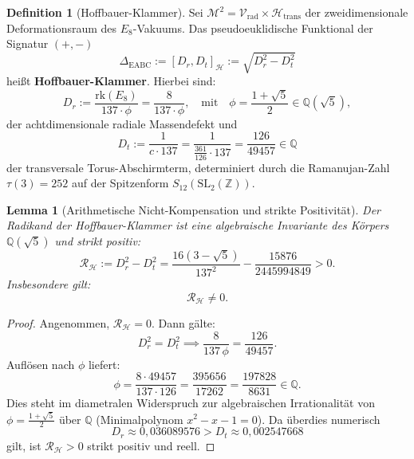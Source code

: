 \documentclass[11pt,a4paper]{article}
\newtheorem{lemma}[theorem]{Lemma}
\theoremstyle{definition}
\newtheorem{definition}[theorem]{Definition}
\theoremstyle{remark}
\numberwithin{equation}{section}
\begin{document}
\begin{definition}[Hoffbauer-Klammer]
Sei $\mathcal{M}^2 = \mathcal{V}_{\mathrm{rad}} \times \mathcal{H}_{\mathrm{trans}}$ der zweidimensionale Deformationsraum des $E_8$-Vakuums. Das pseudoeuklidische Funktional der Signatur $(+,-)$
\begin{equation}
\Delta_{\mathrm{EABC}} := [D_r, D_t]_{\mathcal{H}} := \sqrt{D_r^2 - D_t^2}
\end{equation}
heißt \textbf{Hoffbauer-Klammer}. Hierbei sind:
\begin{equation}
D_r := \frac{\mathrm{rk}(E_8)}{137 \cdot \phi} = \frac{8}{137 \cdot \phi}, \quad \text{mit} \quad \phi = \frac{1+\sqrt{5}}{2} \in \mathbb{Q}(\sqrt{5}),
\end{equation}
der achtdimensionale radiale Massendefekt und
\begin{equation}
D_t := \frac{1}{c \cdot 137} = \frac{1}{\frac{361}{126} \cdot 137} = \frac{126}{49457} \in \mathbb{Q}
\end{equation}
der transversale Torus-Abschirmterm, determiniert durch die Ramanujan-Zahl $\tau(3) = 252$ auf der Spitzenform $S_{12}(\mathrm{SL}_2(\mathbb{Z}))$.
\end{definition}

\begin{lemma}[Arithmetische Nicht-Kompensation und strikte Positivität]
Der Radikand der Hoffbauer-Klammer ist eine algebraische Invariante des Körpers $\mathbb{Q}(\sqrt{5})$ und strikt positiv:
\begin{equation}
\mathcal{R}_{\mathcal{H}} := D_r^2 - D_t^2 = \frac{16(3-\sqrt{5})}{137^2} - \frac{15876}{2445994849} > 0.
\end{equation}
Insbesondere gilt:
\begin{equation}
\mathcal{R}_{\mathcal{H}} \neq 0.
\end{equation}
\end{lemma}

\begin{proof}
Angenommen, $\mathcal{R}_{\mathcal{H}} = 0$. Dann gälte:
\begin{equation}
D_r^2 = D_t^2 \implies \frac{8}{137\,\phi} = \frac{126}{49457}.
\end{equation}
Auflösen nach $\phi$ liefert:
\begin{equation}
\phi = \frac{8 \cdot 49457}{137 \cdot 126} = \frac{395656}{17262} = \frac{197828}{8631} \in \mathbb{Q}.
\end{equation}
Dies steht im diametralen Widerspruch zur algebraischen Irrationalität von $\phi = \frac{1+\sqrt{5}}{2}$ über $\mathbb{Q}$ (Minimalpolynom $x^2 - x - 1 = 0$). 
Da überdies numerisch
\begin{equation}
D_r \approx 0{,}036089576 > D_t \approx 0{,}002547668
\end{equation}
gilt, ist $\mathcal{R}_{\mathcal{H}} > 0$ strikt positiv und reell.
\end{proof}
\end{document}
